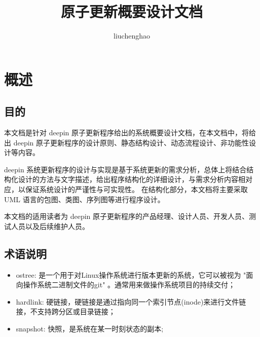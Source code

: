 \documentclass{utart}
\title{原子更新概要设计文档}
\author{liuchenghao}
\begin{document}
\utMakeTOC

\section{概述}
\subsection{目的}
本文档是针对 deepin 原子更新程序给出的系统概要设计文档，在本文档中，将给出 deepin 原子更新程序的设计原则、静态结构设计、动态流程设计、非功能性设计等内容。
\par
deepin 系统更新程序的设计与实现是基于系统更新的需求分析，总体上将结合结构化设计的方法与文字描述，给出程序结构化的详细设计，与需求分析内容相对应，以保证系统设计的严谨性与可实现性。
在结构化部分，本文档将主要采取 UML 语言的包图、类图、序列图等进行程序设计。
\par
本文档的适用读者为 deepin 原子更新程序的产品经理、设计人员、开发人员、测试人员以及后续维护人员。

\subsection{术语说明}
\begin{itemize}[leftmargin=4em]
\item ostree: 是一个用于对Linux操作系统进行版本更新的系统，它可以被视为 "面向操作系统二进制文件的git" 。通常用来做操作系统项目的持续交付；
\item hardlink: 硬链接，硬链接是通过指向同一个索引节点(inode)来进行文件链接，不支持跨分区或目录链接；
\item snapshot: 快照，是系统在某一时刻状态的副本;
\end{itemize}
\end{document}
